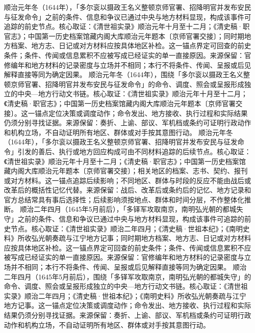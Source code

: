 顺治元年冬（1644年），「多尔衮以摄政王名义整顿京师官署、招降明官并发布安民与征发命令」之前的条件、信息和争议已通过中央与地方材料显现，构成该事件可追踪的前史节点。核心取证：《清世祖实录》顺治元年十月至十二月；《清史稿·职官志》；中国第一历史档案馆藏内阁大库顺治元年题本〔京师官署交接〕；同时期地方档案、地方志、日记或对方材料应按具体地区补检。这一锚点界定可回查的前史条件；条件、传闻或信息累积不应被写成已经证实的单一直接原因。来源保留：官修编年和地方材料的记录密度与立场并不相同；本行不将条件、传闻、呈报或后见解释直接等同为确定因果。
顺治元年冬（1644年），围绕「多尔衮以摄政王名义整顿京师官署、招降明官并发布安民与征发命令」的命令、调度、照会或呈报形成独立的中央—地方行动文书链。核心取证：《清世祖实录》顺治元年十月至十二月；《清史稿·职官志》；中国第一历史档案馆藏内阁大库顺治元年题本〔京师官署交接〕。这一锚点定位决策或调度动作；命令发出、地方接收、执行过程和实际结果仍须分别寻找证据。来源保留：奏折、上谕、部议、军机档或条约可证明行政动作和机构立场，不自动证明所有地区、群体或对手按其意图行动。
顺治元年冬（1644年），「多尔衮以摄政王名义整顿京师官署、招降明官并发布安民与征发命令」引发的善后、执行或地方回应构成可由不同材料追踪的后续节点。核心取证：《清世祖实录》顺治元年十月至十二月；《清史稿·职官志》；中国第一历史档案馆藏内阁大库顺治元年题本〔京师官署交接〕；相关地区的档案、志书、契约、报刊或对方材料。这一锚点追踪后续影响；不同地区、群体与时段的反应不能由战后或改革后的概括性记忆代替。来源保留：战后、改革后或条约后的记忆、地方记录和官方总结常具有事后选择性；后续影响须按地点、群体和时间分层，不作整体化推断。
顺治二年四月（1645年5月前后），「多铎军攻取南京，南明弘光朝的都城失守」之前的条件、信息和争议已通过中央与地方材料显现，构成该事件可追踪的前史节点。核心取证：《清世祖实录》顺治二年四月；《清史稿·世祖本纪》；《南明史料》所收弘光朝奏疏与江宁地方记事；同时期地方档案、地方志、日记或对方材料应按具体地区补检。这一锚点界定可回查的前史条件；条件、传闻或信息累积不应被写成已经证实的单一直接原因。来源保留：官修编年和地方材料的记录密度与立场并不相同；本行不将条件、传闻、呈报或后见解释直接等同为确定因果。
顺治二年四月（1645年5月前后），围绕「多铎军攻取南京，南明弘光朝的都城失守」的命令、调度、照会或呈报形成独立的中央—地方行动文书链。核心取证：《清世祖实录》顺治二年四月；《清史稿·世祖本纪》；《南明史料》所收弘光朝奏疏与江宁地方记事。这一锚点定位决策或调度动作；命令发出、地方接收、执行过程和实际结果仍须分别寻找证据。来源保留：奏折、上谕、部议、军机档或条约可证明行政动作和机构立场，不自动证明所有地区、群体或对手按其意图行动。
